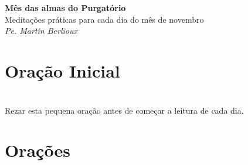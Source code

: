 \documentclass[a5paper, 12pt]{memoir}
\newcommand{\thechapterrunner}{}
\begin{document}
\frontmatter %

\begin{titlingpage}
  \vspace*{\fill}
  \begin{center}
    {\Huge\bfseries Mês das almas do Purgatório}\\[1.5em]
    {\Large Meditações práticas para cada dia do mês de novembro}\\[1.5em]
    {\large\itshape Pe. Martin Berlioux}\\[3em]
  \end{center}
  \vspace*{\fill}
\end{titlingpage}

\tableofcontents

\begingroup
\setlength{\parindent}{0pt}

\endgroup

\chapter{Oração Inicial}


\\

\noindent Rezar esta pequena oração antes de começar a leitura de cada dia.



\mainmatter %
































\backmatter



\begingroup
\setlength{\parindent}{0pt}
\renewcommand{\thechapterrunner}{Orações}
\chapter{Orações}






\endgroup
\end{document}
